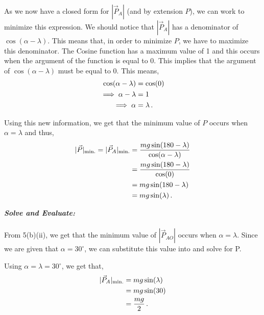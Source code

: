 \begin{subquestions}
\begin{subsubquestions}
	As we now have a closed form for $|\vec{P}_{A}|$ (and by extension $P$), we can work to minimize this expression. We should notice that $|\vec{P}_{A}|$ has a denominator of $\cos(\alpha - \lambda)$. This means that, in order to minimize $P$, we have to maximize this denominator. The Cosine function has a maximum value of 1 and this occurs when the argument of the function is equal to 0. This implies that the argument of $\cos(\alpha - \lambda)$ must be equal to 0. This means,
	\begin{align}
		\cos(\alpha - \lambda) & = \cos(0) \nonumber \\
		\implies \alpha - \lambda & = 1 \nonumber \\
		\implies \alpha & = \lambda \,.
	\end{align}
	
	Using this new information, we get that the minimum value of $P$ occurs when $\alpha=\lambda$ and thus,
	\begin{align}
	|\vec{P}|_{\text{min.}} = |\vec{P}_{A}|_{\text{min.}} & = \frac{mg\sin(180-\lambda)}{\cos(\alpha-\lambda)} \nonumber \\
		& = \frac{mg\sin(180-\lambda)}{\cos(0)} \nonumber \\
		& = mg\sin(180-\lambda) \nonumber \\
		& = mg\sin(\lambda) \,. \label{2014:q55:MinP}
	\end{align}

	
	\subsubquestion
	
	\textbf{\textit{Solve and Evaluate:}} \\ \\
	From 5(b)(ii), we get that the minimum value of $|\vec{P}_{AO}|$ occurs when $\alpha=\lambda$. Since we are given that $\alpha=30^\circ$, we can substitute this value into  and solve for P.
	
	Using $\alpha=\lambda=30^\circ$, we get that,
	\begin{align}
		|\vec{P}_{A}|_{\text{min.}} & = mg\sin(\lambda) \nonumber \\
		& = mg\sin(30) \nonumber \\
		& = \frac{mg}{2} \,.
	\end{align}
	
\end{subsubquestions}

\end{subquestions}